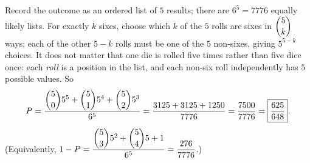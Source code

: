 Record the outcome as an ordered list of $5$ results; there are $6^5=7776$ equally likely lists. For exactly $k$ sixes, choose which $k$ of the $5$ rolls are sixes in $\dbinom5k$ ways; each of the other $5-k$ rolls must be one of the $5$ non-sixes, giving $5^{5-k}$ choices. It does not matter that one die is rolled five times rather than five dice once: each \emph{roll} is a position in the list, and each non-six roll independently has $5$ possible values. So
\[
P=\dfrac{\dbinom50 5^5+\dbinom51 5^4+\dbinom52 5^3}{6^5}=\dfrac{3125+3125+1250}{7776}=\dfrac{7500}{7776}=\boxed{\dfrac{625}{648}} .
\]
(Equivalently, $1-P=\dfrac{\dbinom53 5^2+\dbinom54 5+1}{6^5}=\dfrac{276}{7776}$.)
